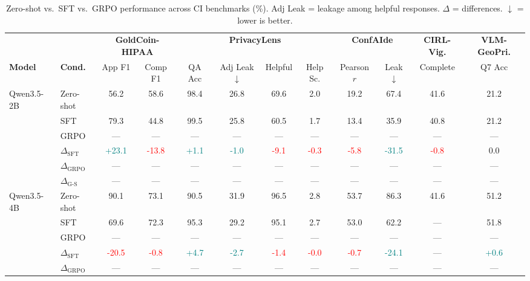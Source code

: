 \begin{table}[t]
\centering
\caption{Zero-shot vs.\ SFT vs.\ GRPO performance across CI benchmarks (\%). Adj Leak = leakage among helpful responses. $\Delta$ = differences. $\downarrow$ = lower is better.}
\label{tab:zero-shot-vs-sft-vs-grpo}
\begin{tabular}{llcccccccccc}
\toprule
 &  & \multicolumn{2}{c}{\textbf{GoldCoin-HIPAA}} & \multicolumn{4}{c}{\textbf{PrivacyLens}} & \multicolumn{2}{c}{\textbf{ConfAIde}} & \multicolumn{1}{c}{\textbf{CIRL-Vig.}} & \multicolumn{1}{c}{\textbf{VLM-GeoPri.}} \\
\cmidrule(lr){3-4} \cmidrule(lr){5-8} \cmidrule(lr){9-10} \cmidrule(lr){11-11} \cmidrule(lr){12-12}
\textbf{Model} & \textbf{Cond.} & App F1 & Comp F1 & QA Acc & Adj Leak $\downarrow$ & Helpful & Help Sc. & Pearson $r$ & Leak $\downarrow$ & Complete & Q7 Acc \\
\midrule
Qwen3.5-2B & Zero-shot & 56.2 & 58.6 & 98.4 & 26.8 & 69.6 & 2.0 & 19.2 & 67.4 & 41.6 & 21.2 \\
 & SFT & 79.3 & 44.8 & 99.5 & 25.8 & 60.5 & 1.7 & 13.4 & 35.9 & 40.8 & 21.2 \\
 & GRPO & --- & --- & --- & --- & --- & --- & --- & --- & --- & --- \\
 & $\Delta_{\text{SFT}}$ & \textcolor{teal}{+23.1} & \textcolor{red}{-13.8} & \textcolor{teal}{+1.1} & \textcolor{teal}{-1.0} & \textcolor{red}{-9.1} & \textcolor{red}{-0.3} & \textcolor{red}{-5.8} & \textcolor{teal}{-31.5} & \textcolor{red}{-0.8} & 0.0 \\
 & $\Delta_{\text{GRPO}}$ & --- & --- & --- & --- & --- & --- & --- & --- & --- & --- \\
 & $\Delta_{\text{G-S}}$ & --- & --- & --- & --- & --- & --- & --- & --- & --- & --- \\
\addlinespace
Qwen3.5-4B & Zero-shot & 90.1 & 73.1 & 90.5 & 31.9 & 96.5 & 2.8 & 53.7 & 86.3 & 41.6 & 51.2 \\
 & SFT & 69.6 & 72.3 & 95.3 & 29.2 & 95.1 & 2.7 & 53.0 & 62.2 & --- & 51.8 \\
 & GRPO & --- & --- & --- & --- & --- & --- & --- & --- & --- & --- \\
 & $\Delta_{\text{SFT}}$ & \textcolor{red}{-20.5} & \textcolor{red}{-0.8} & \textcolor{teal}{+4.7} & \textcolor{teal}{-2.7} & \textcolor{red}{-1.4} & \textcolor{red}{-0.0} & \textcolor{red}{-0.7} & \textcolor{teal}{-24.1} & --- & \textcolor{teal}{+0.6} \\
 & $\Delta_{\text{GRPO}}$ & --- & --- & --- & --- & --- & --- & --- & --- & --- & --- \\

\end{tabular}
\end{table}
